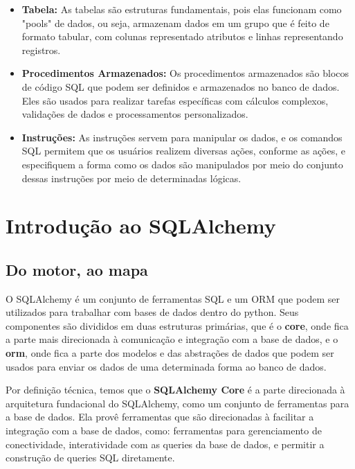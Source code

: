 \documentclass[12pt, a4paper]{paper}
\begin{document}
\begin{itemize}
  \item \textbf{Tabela: }As tabelas são estruturas fundamentais, pois elas funcionam como "pools" de dados, ou seja, armazenam dados em um grupo que é feito de formato tabular, com colunas representado atributos e linhas representando registros.
  \item \textbf{Procedimentos Armazenados: } Os procedimentos armazenados são blocos de código SQL que podem ser definidos e armazenados no banco de dados. Eles são usados para realizar tarefas específicas com cálculos complexos, validações de dados e processamentos personalizados.
  \item \textbf{Instruções: }As instruções servem para manipular os dados, e os comandos SQL permitem que os usuários realizem diversas ações, conforme as ações, e especifiquem a forma como os dados são manipulados por meio do conjunto dessas instruções por meio de determinadas lógicas.
\end{itemize}

\newpage
\section{Introdução ao SQLAlchemy} %
\label{sec:Introdução ao SQLAlchemy}
\subsection{Do motor, ao mapa} %
\label{sub:Do motor, ao mapa}

  O SQLAlchemy é um conjunto de ferramentas SQL e um ORM que podem ser utilizados para 
trabalhar com bases de dados dentro do python. Seus componentes são divididos em duas 
estruturas primárias, que é o \textbf{core}, onde fica a parte mais direcionada à 
comunicação e integração com a base de dados, e o \textbf{orm}, onde fica a parte dos 
modelos e das abstrações de dados que podem ser usados para enviar os dados de uma 
determinada forma ao banco de dados.

Por definição técnica, temos que o \textbf{SQLAlchemy Core} é a parte direcionada à 
arquitetura fundacional do SQLAlchemy, como um conjunto de ferramentas para a base de 
dados. Ela provê ferramentas que são direcionadas à facilitar a integração com a base 
de dados, como: ferramentas para gerenciamento de conectividade, interatividade com as 
queries da base de dados, e permitir a construção de queries SQL diretamente. 
\end{document}
